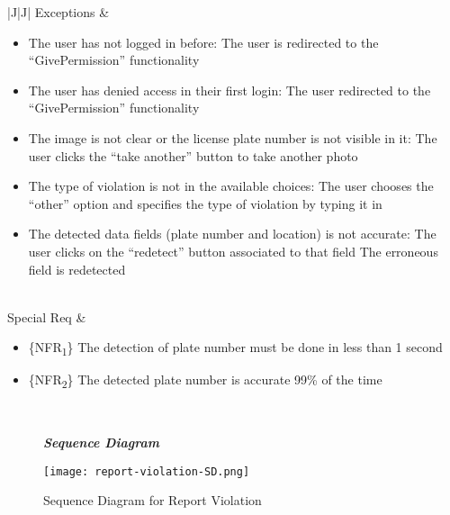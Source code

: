 \begin{table}[H]
\begin{tabulary}{\textwidth}{|J|J|}
\hline
Exceptions      & 
\begin{minipage}[t]{0.8\textwidth}
\begin{itemize} 
\item The user has not logged in before: The user is redirected to the “GivePermission” functionality
\item The user has denied access in their first login:   The user redirected to the “GivePermission” functionality
\item The image is not clear or the license plate number is not visible in it: The user clicks the “take another” button to take another photo
\item The type of violation is not in the available choices: The user chooses the “other” option and specifies the type of violation by typing it in
\item The detected data fields (plate number and location) is not accurate: The user clicks on the “redetect” button associated to that field The erroneous field is redetected\\
\end{itemize}
\end{minipage}\\
\hline
Special Req     & 
\begin{minipage}[t]{0.8\textwidth}
\begin{itemize}
\item \{NFR\textsubscript{1}\} The detection of plate number must be done in less than 1 second
\item \{NFR\textsubscript{2}\} The detected plate number is accurate 99\% of the time
\end{itemize}
\end{minipage}\\
\hline
\end{tabulary}
\caption{\label{tab:report-usecase}Usecase for Report Violation}
\end{table}


\begin{figure}[H]
\begin{flushleft}\emph{\textbf{Sequence Diagram}}\end{flushleft}
\caption{Sequence Diagram for Report Violation}
\label{fig:report-violation-SD}
\centering
\texttt{[image: report-violation-SD.png]}
\end{figure}


